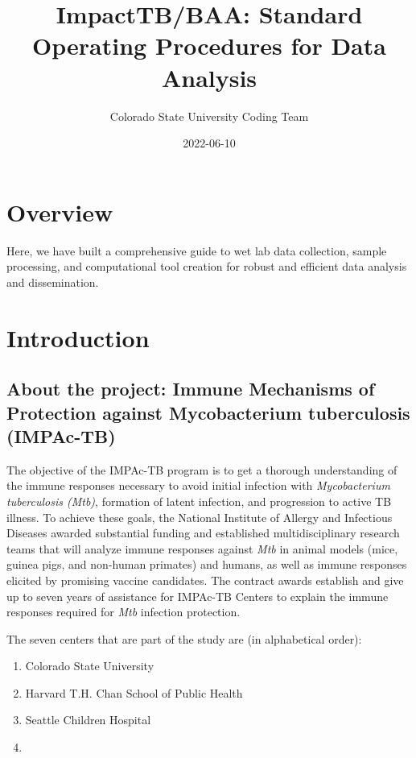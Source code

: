 \documentclass[
]{book}
\title{ImpactTB/BAA: Standard Operating Procedures for Data Analysis}
\author{Colorado State University Coding Team}
\date{2022-06-10}
\providecommand{\tightlist}{%
  \setlength{\itemsep}{0pt}\setlength{\parskip}{0pt}}
\begin{document}
\maketitle

{
\setcounter{tocdepth}{1}
\tableofcontents
}
\hypertarget{overview}{%
\chapter{Overview}\label{overview}}

Here, we have built a comprehensive guide to wet lab data collection, sample processing, and computational tool creation for robust and efficient data analysis and dissemination.

\hypertarget{introduction}{%
\chapter{Introduction}\label{introduction}}

\hypertarget{about-the-project-immune-mechanisms-of-protection-against-mycobacterium-tuberculosis-impac-tb}{%
\section{About the project: Immune Mechanisms of Protection against Mycobacterium tuberculosis (IMPAc-TB)}\label{about-the-project-immune-mechanisms-of-protection-against-mycobacterium-tuberculosis-impac-tb}}

The objective of the IMPAc-TB program is to get a thorough understanding of the immune responses necessary to avoid initial infection with \emph{Mycobacterium tuberculosis (Mtb)}, formation of latent infection, and progression to active TB illness. To achieve these goals, the National Institute of Allergy and Infectious Diseases awarded substantial funding and established multidisciplinary research teams that will analyze immune responses against \emph{Mtb} in animal models (mice, guinea pigs, and non-human primates) and humans, as well as immune responses elicited by promising vaccine candidates. The contract awards establish and give up to seven years of assistance for IMPAc-TB Centers to explain the immune responses required for \emph{Mtb} infection protection.

The seven centers that are part of the study are (in alphabetical order):

\begin{enumerate}
\def\labelenumi{\arabic{enumi}.}
\tightlist
\item
  Colorado State University
\item
  Harvard T.H. Chan School of Public Health
\item
  Seattle Children Hospital
\item
\end{enumerate}
\end{document}
